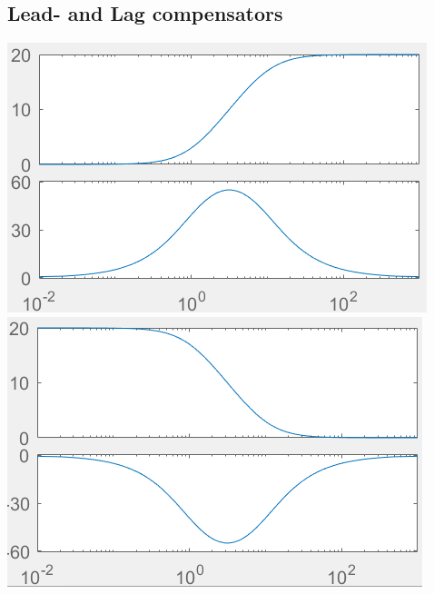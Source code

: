 \subsection{Lead- and Lag compensators}
    \includegraphics[width = \linewidth]{src/images/lead-controller.png}
    \includegraphics[width = \linewidth]{src/images/lag-controller.png}